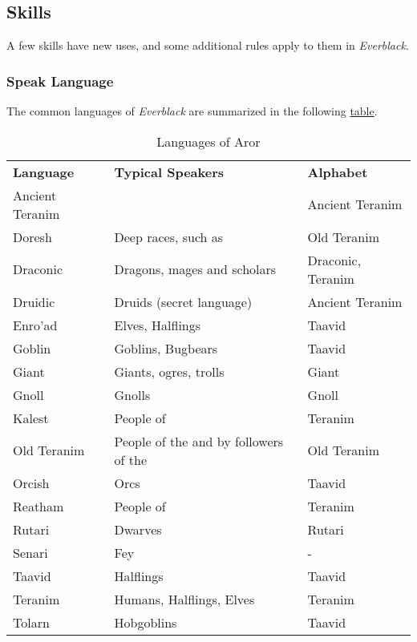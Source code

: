 \subsection{Skills}
\label{sec:Skills}

A few skills have new uses, and some additional rules apply to them in
\emph{Everblack}.

\subsubsection{Speak Language}

The common languages of \emph{Everblack} are summarized in the following
\hyperref[tbl:Languages]{table}.

\begin{table*}[!htb]
  \caption{Languages of Aror} \label{tbl:Languages}
  \begin{tabular}{l p{8cm} l}
    \textbf{Language} & \textbf{Typical Speakers} & \textbf{Alphabet} \\
    Ancient Teranim & \nameref{sec:Tynrikke}      & Ancient Teranim \\
    Doresh          & Deep races, such as \nameref{sec:Deepkin} & Old Teranim \\
    Draconic        & Dragons, mages and scholars & Draconic, Teranim \\
    Druidic         & Druids (secret language)    & Ancient Teranim \\
    Enro'ad         & Elves, Halflings            & Taavid \\
    Goblin          & Goblins, Bugbears           & Taavid \\
    Giant           & Giants, ogres, trolls       & Giant \\
    Gnoll           & Gnolls                      & Gnoll \\
    Kalest          & People of \nameref{sec:Arania} & Teranim \\
    Old Teranim     & People of the \nameref{sec:Dirgewood} and by followers of the \nameref{sec:Old Ways} & Old Teranim \\
    Orcish          & Orcs                        & Taavid \\
    Reatham         & People of \nameref{sec:Forsby} & Teranim \\
    Rutari          & Dwarves                     & Rutari \\
    Senari          & Fey                         & - \\
    Taavid          & Halflings                   & Taavid \\
    Teranim         & Humans, Halflings, Elves    & Teranim \\
    Tolarn          & Hobgoblins                  & Taavid \\
  \end{tabular}
\end{table*}

